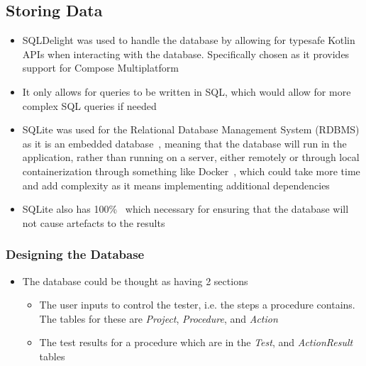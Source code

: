 \documentclass[../dissertation.tex]{subfiles}
\begin{document}
\subsection{Storing Data}
\begin{itemize}
  \item SQLDelight was used to handle the database by allowing for typesafe Kotlin APIs when interacting with the database.
    Specifically chosen as it provides support for Compose Multiplatform~\cite{sqldelight}
  \item It only allows for queries to be written in SQL, which would allow for more complex SQL queries if needed
  \item SQLite was used for the Relational Database Management System (RDBMS) as it is an embedded database~\cite{sqlite:about},
    meaning that the database will run in the application, rather than running on a server,
    either remotely or through local containerization through something like Docker~\cite{docker:container},
    which could take more time and add complexity as it means implementing additional dependencies
  \item SQLite also has 100\%~\cite{sqlite:tests} which necessary for ensuring that the database will
    not cause artefacts to the results
\end{itemize}

\subsubsection{Designing the Database}
\begin{itemize}
  \item The database could be thought as having 2 sections
    \begin{itemize}
      \item The user inputs to control the tester, i.e. the steps a procedure contains.
        The tables for these are \textit{Project}, \textit{Procedure}, and \textit{Action}
      \item The test results for a procedure which are in the \textit{Test}, and \textit{ActionResult} tables
    \end{itemize}
\end{itemize}
\end{document}
